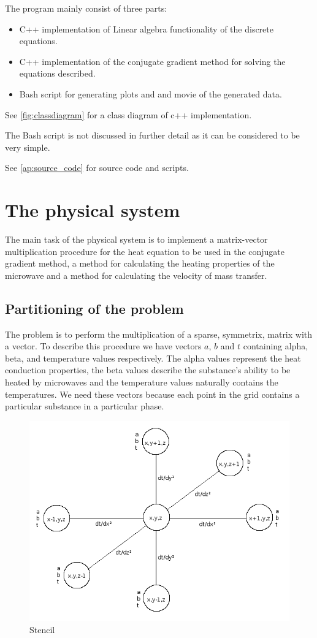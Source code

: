 The program mainly consist of three parts:

\begin{itemize}
\item C++ implementation of Linear algebra functionality of the discrete equations.
\item C++ implementation of the conjugate gradient method for solving the
equations described.
\item Bash script for generating plots and and movie of the generated data.
\end{itemize}

See \cref{fig:classdiagram} for a class diagram of c++ implementation.

The Bash script is not discussed in further detail as it can be considered to be
very simple.

See \cref{ap:source_code} for source code and scripts.

\section{The physical system}

The main task of the physical system is to implement a matrix-vector multiplication
procedure for the heat equation to be used in the conjugate gradient method, 
a method for calculating the heating properties of the microwave and a method 
for calculating the velocity of mass transfer.

\subsection{Partitioning of the problem}

The problem is to perform the multiplication of a sparse, symmetrix, matrix with a
vector. To describe this procedure we have vectors $a$, $b$ and $t$ containing alpha,
beta, and temperature values respectively. The alpha values represent the heat 
conduction properties, the beta values describe the substance's ability to be heated
by microwaves and the temperature values naturally contains the temperatures. We need
these vectors because each point in the grid contains a particular substance in
a particular phase.

\begin{figure}[!h]
  \begin{center}
    \includegraphics[width=0.5\linewidth]{stencil.png}
  \end{center}
  \caption{Stencil}
  \label{fig:stencil}
\end{figure}

